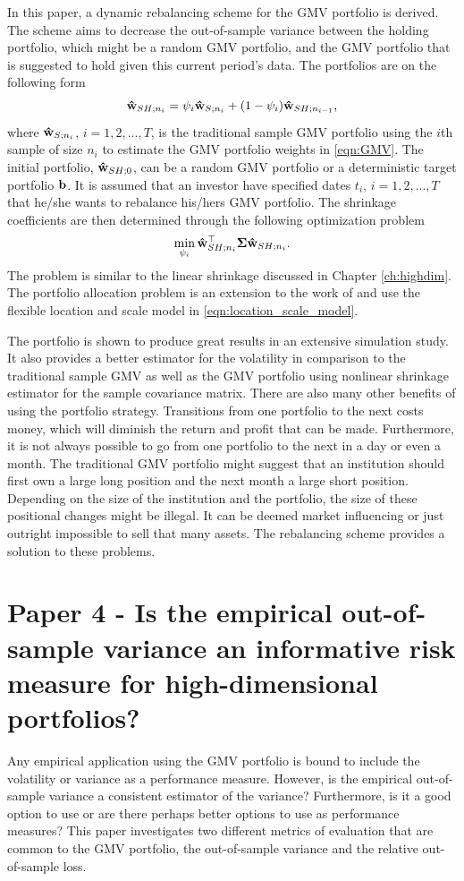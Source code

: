 \documentclass[12pt, oneside]{book}\usepackage{knitr}
\begin{document}
{In this paper, a dynamic rebalancing scheme for the GMV portfolio is derived. 
The scheme aims to decrease the out-of-sample variance between the holding portfolio, which might be a random GMV portfolio, and the GMV portfolio that is suggested to hold given this current period's data. 
The portfolios are on the following form
\begin{equation}
  \mathbf{\hat{w}}_{SH;n_{i}}=\psi_{i}\mathbf{\hat{w}}_{S;n_i}+ (1-\psi_{i})\mathbf{\hat{w}}_{SH;n_{i-1}},
\end{equation}
where $\mathbf{\hat{w}}_{S;n_i}$, $i=1,2,...,T$, is the traditional sample GMV portfolio using the $i$th sample of size $n_i$ to estimate the GMV portfolio weights in \eqref{eqn:GMV}. 
The initial portfolio, $\mathbf{\hat{w}}_{SH;0}$, can be a random GMV portfolio or a deterministic target portfolio $\mathbf{b}$.
It is assumed that an investor have specified dates $t_i$, $i=1,2,...,T$ that he/she wants to rebalance his/hers GMV portfolio. 
The shrinkage coefficients are then determined through the following optimization problem
$$
\min_{\psi_i} \mathbf{\hat{w}}_{SH;n_{i}}^\top \mathbf{\Sigma} \mathbf{\hat{w}}_{SH;n_{i}}.
$$
The problem is similar to the linear shrinkage discussed in Chapter \ref{ch:highdim}.
The portfolio allocation problem is an extension to the work of \citet{bodnar2018estimation} and use the flexible location and scale model in \eqref{eqn:location_scale_model}.

The portfolio is shown to produce great results in an extensive simulation study.
It also provides a better estimator for the volatility in comparison to the traditional sample GMV as well as the GMV portfolio using \citet{lw20} nonlinear shrinkage estimator for the sample covariance matrix.
There are also many other benefits of using the portfolio strategy.
Transitions from one portfolio to the next costs money, which will diminish the return and profit that can be made.
Furthermore, it is not always possible to go from one portfolio to the next in a day or even a month.
The traditional GMV portfolio might suggest that an institution should first own a large long position and the next month a large short position.
Depending on the size of the institution and the portfolio, the size of these positional changes might be illegal. 
It can be deemed market influencing or just outright impossible to sell that many assets.
The rebalancing scheme provides a solution to these problems.

\section{Paper 4 - Is the empirical out-of-sample variance an informative risk measure for high-dimensional portfolios?}\label{sec:paper4}
Any empirical application using the GMV portfolio is bound to include the volatility or variance as a performance measure. 
However, is the empirical out-of-sample variance a consistent estimator of the variance? 
Furthermore, is it a good option to use or are there perhaps better options to use as performance measures? 
This paper investigates two different metrics of evaluation that are common to the GMV portfolio, the out-of-sample variance and the relative out-of-sample loss. 

}
\end{document}
